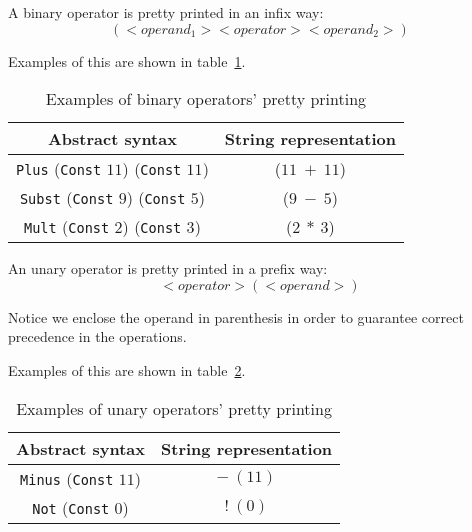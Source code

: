 A binary operator is pretty printed in an infix way:
\begin{equation*}
(<operand_1> <operator> <operand_2>)
\end{equation*}

Examples of this are shown in table~\ref{tab:pretty_bin_op}.

\begin{table}[h!]
\centering
\begin{tabular}{|c|c|}
  \hline
  \textbf{Abstract syntax} & \textbf{String representation} \\ [0.5ex]
  \hline \hline
  \verb|Plus| (\verb|Const| $11$) (\verb|Const| $11$) & ($11\ +\ 11$) \\
  \verb|Subst| (\verb|Const| $9$) (\verb|Const| $5$) & ($9\ -\ 5$) \\
  \verb|Mult| (\verb|Const| $2$) (\verb|Const| $3$) & ($2\ *\ 3$) \\
  \hline
\end{tabular}

\caption{Examples of binary operators' pretty printing}
\label{tab:pretty_bin_op}
\end{table}

An unary operator is pretty printed in a prefix way:
\begin{equation*}
<operator> (<operand>)
\end{equation*}

Notice we enclose the operand in parenthesis in order to guarantee correct precedence in the operations.

Examples of this are shown in table~\ref{tab:pretty_un_op}.

\begin{table}[h!]
\centering
\begin{tabular}{|c|c|}
  \hline
  \textbf{Abstract syntax} & \textbf{String representation} \\ [0.5ex]
  \hline \hline
  \verb|Minus| (\verb|Const| $11$) & $-\ (11)$ \\
  \verb|Not| (\verb|Const| $0$) & $!\ (0)$ \\
  \hline
\end{tabular}

\caption{Examples of unary operators' pretty printing}
\label{tab:pretty_un_op}
\end{table}

